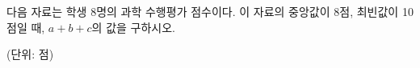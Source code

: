 다음 자료는 학생 8명의 과학 수행평가 점수이다. 이 자료의 중앙값이 8점, 최빈값이 10점일 때, $a+b+c$의 값을 구하시오.\par\noindent\hfill{\footnotesize (단위: 점)}
